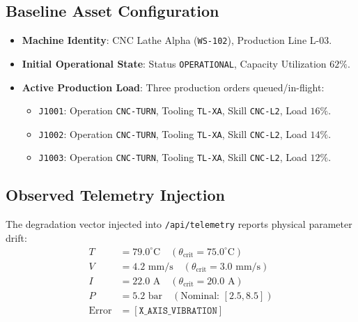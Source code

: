 \documentclass[10pt,twocolumn,a4paper]{article}
\begin{document}
\subsection{Baseline Asset Configuration}
\begin{itemize}
    \item \textbf{Machine Identity}: CNC Lathe Alpha (\texttt{WS-102}), Production Line L-03.
    \item \textbf{Initial Operational State}: Status \texttt{OPERATIONAL}, Capacity Utilization $62\%$.
    \item \textbf{Active Production Load}: Three production orders queued/in-flight:
    \begin{itemize}
        \item \texttt{J1001}: Operation \texttt{CNC-TURN}, Tooling \texttt{TL-XA}, Skill \texttt{CNC-L2}, Load $16\%$.
        \item \texttt{J1002}: Operation \texttt{CNC-TURN}, Tooling \texttt{TL-XA}, Skill \texttt{CNC-L2}, Load $14\%$.
        \item \texttt{J1003}: Operation \texttt{CNC-TURN}, Tooling \texttt{TL-XA}, Skill \texttt{CNC-L2}, Load $12\%$.
    \end{itemize}
\end{itemize}

\subsection{Observed Telemetry Injection}
The degradation vector injected into \texttt{/api/telemetry} reports physical parameter drift:
\begin{align*}
    T &= 79.0^\circ\text{C} \quad (\theta_{\text{crit}} = 75.0^\circ\text{C}) \\
    V &= 4.2\text{ mm/s} \quad (\theta_{\text{crit}} = 3.0\text{ mm/s}) \\
    I &= 22.0\text{ A} \quad (\theta_{\text{crit}} = 20.0\text{ A}) \\
    P &= 5.2\text{ bar} \quad (\text{Nominal: } [2.5, 8.5]) \\
    \text{Error} &= [\texttt{X\_AXIS\_VIBRATION}]
\end{align*}
\end{document}
